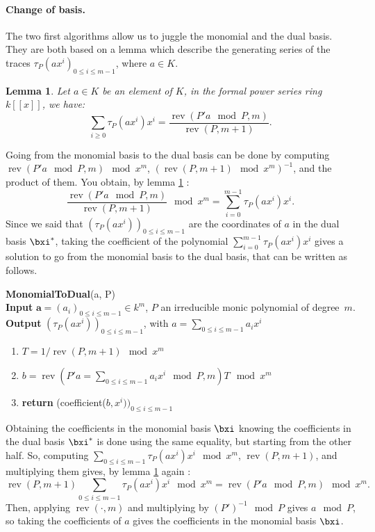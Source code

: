 \documentclass[a4paper,11pt]{article}
\theoremstyle{break}
\newtheorem{lm}[thm]{Lemma}
\theoremstyle{definition}
\theoremstyle{remark}
\DeclareMathOperator{\rev}{rev}
\begin{document}
\paragraph{Change of basis.}The two
first algorithms allow us to juggle the monomial and the dual basis. They are
both based on a lemma which describe the generating series of the traces
$\tau_P(ax^i)_{0\leq i \leq m-1}$, where $a\in K$. 
\begin{lm}
  \label{lm-basis}
  Let $a\in K$ be an element of $K$, in the formal power series ring $k[[x]]$,
  we have:
  \[
    \sum_{i\geq 0}\tau_P(ax^i)x^i=\frac{\rev(P'a\mod P,m)}{\rev(P,m+1)}.
  \]
\end{lm}
Going from the monomial basis to the dual basis can be done by computing
$\rev(P'a\mod P,m)\mod x^m$, $(\rev(P,m+1)\mod x^m)^{-1}$, and the product of
them. You obtain, by lemma \ref{lm-basis} :
\[
  \frac{\rev(P'a\mod P,m)}{\rev(P,m+1)}\mod x^m=\sum_{i=0}^{m-1}\tau_P(ax^i)x^i.
\]
Since we said that
$(\tau_P(ax^i))_{0\leq i \leq m-1}$ are the coordinates of $a$ in the dual basis
$\bxi^*$, taking the coefficient of the polynomial
$\sum_{i=0}^{m-1}\tau_P(ax^i)x^i$ gives a solution to go from the monomial basis
to the dual basis, that can be written as follows.
\newline

\textbf{MonomialToDual}(a, P)\\
\textbf{Input} $\textbf{a}=(a_i)_{0\leq i\leq m-1}\in k^m$, $P$ an irreducible
monic polynomial of degree~$m$.\\
\textbf{Output} $(\tau_P(ax^i))_{0\leq i \leq m-1}$, with $a=\sum_{0\leq i
\leq m-1}a_ix^i$
\begin{enumerate}
  \item $T=1/\rev(P,m+1) \mod x^m$
  \item $b=\rev(P'a=\sum_{0\leq i\leq m-1}a_ix^i \mod P,m)T\mod x^m$
  \item \textbf{return} (coefficient($b,x^i))_{0\leq i \leq m-1}$
\end{enumerate}

Obtaining the coefficients in the monomial basis $\bxi$
knowing the coefficients in the dual basis $\bxi^*$ is done using the same
equality, but starting from the other half. So, computing $\sum_{0\leq i \leq
m-1}\tau_P(ax^i)x^i \mod x^m$, $\rev(P,m+1)$, and multiplying them gives, by
lemma \ref{lm-basis} again : 
\[
\rev(P,m+1)\sum_{0\leq i \leq m-1}\tau_P(ax^i)x^i \mod x^m = \rev(P'a\mod P,m) 
\mod x^m.
\]
Then, applying $\rev(\cdot,m)$ and multiplying by $(P')^{-1}\mod P$ gives $a\mod
P$, so taking the coefficients of $a$ gives the coefficients in the monomial
basis $\bxi$.
\newline
\end{document}
